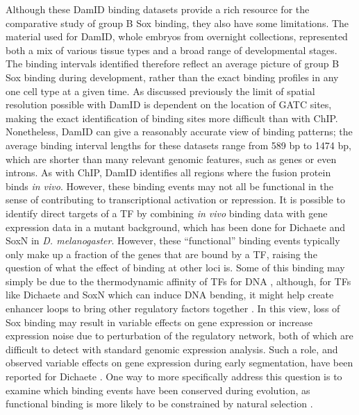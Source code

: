 Although these DamID binding datasets provide a rich resource for the comparative study of group B Sox binding, they also have some limitations. The material used for DamID, whole embryos from overnight collections, represented both a mix of various tissue types and a broad range of developmental stages. The binding intervals identified therefore reflect an average picture of group B Sox binding during development, rather than the exact binding profiles in any one cell type at a given time. As discussed previously the limit of spatial resolution possible with DamID is dependent on the location of GATC sites, making the exact identification of binding sites more difficult than with ChIP. Nonetheless, DamID can give a reasonably accurate view of binding patterns; the average binding interval lengths for these datasets range from 589 bp to 1474 bp, which are shorter than many relevant genomic features, such as genes or even introns. As with ChIP, DamID identifies all regions where the fusion protein binds \emph{in vivo}. However, these binding events may not all be functional in the sense of contributing to transcriptional activation or repression. It is possible to identify direct targets of a TF by combining \emph{in vivo} binding data with gene expression data in a mutant background, which has been done for Dichaete and SoxN in \emph{D. melanogaster}. However, these “functional” binding events typically only make up a fraction of the genes that are bound by a TF, raising the question of what the effect of binding at other loci is. Some of this binding may simply be due to the thermodynamic affinity of TFs for DNA \citep{biggin_animal_2011,fisher_dna_2012,kaplan_quantitative_2011}, although, for TFs like Dichaete and SoxN which can induce DNA bending, it might help create enhancer loops to bring other regulatory factors together \citep{ghavi-helm_enhancer_2014}. In this view, loss of Sox binding may result in variable effects on gene expression or increase expression noise due to perturbation of the regulatory network, both of which are difficult to detect with standard genomic expression analysis. Such a role, and observed variable effects on gene expression during early segmentation, have been reported for Dichaete \citep{russell_dichaete_1996}. One way to more specifically address this question is to examine which binding events have been conserved during evolution, as functional binding is more likely to be constrained by natural selection \citep{biggin_animal_2011}.

